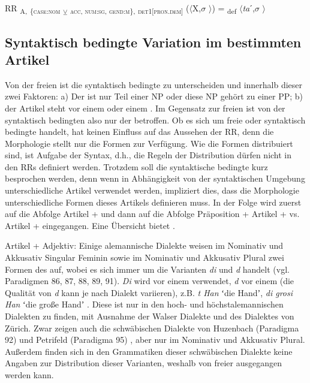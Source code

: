 \ea%
\label{ex:key:139}
 RR \textsubscript{A,} \textsubscript{\{\textsc{case:nom}} \textsubscript{\tiny $\veebar$}\textsubscript{ \textsc{acc}}\textsubscript{, \textsc{num:sg}, \textsc{gend:m}\},} \textsubscript{\textsc{det1[pron.dem]}} ($\langle$X,$\sigma$ $\rangle$) = \textsubscript{def} $\langle$\textit{ta}ˊ,$\sigma$ $\rangle$
\z

\subsection{Syntaktisch bedingte Variation im bestimmten Artikel}\label{5.5.5}

Von der freien  ist die syntaktisch bedingte  zu unterscheiden und innerhalb dieser zwei Faktoren: a) Der  ist nur Teil einer NP oder diese NP gehört zu einer PP; b) der Artikel steht vor einem  oder einem . Im Gegensatz zur freien  ist von der syntaktisch bedingten  also nur der  betroffen. Ob es sich um freie oder syntaktisch bedingte  handelt, hat keinen Einfluss auf das Aussehen der RR, denn die Morphologie stellt nur die Formen zur Verfügung. Wie die Formen distribuiert sind, ist Aufgabe der Syntax, d.h., die Regeln der Distribution dürfen nicht in den RRs definiert werden. Trotzdem soll die syntaktische bedingte  kurz besprochen werden, denn wenn in Abhängigkeit von der syntaktischen Umgebung unterschiedliche Artikel verwendet werden, impliziert dies, dass die Morphologie unterschiedliche Formen dieses Artikels definieren muss. In der Folge wird zuerst auf die Abfolge Artikel +  und dann auf die Abfolge Präposition + Artikel +  vs. Artikel +  eingegangen. Eine Übersicht bietet .

{Artikel + Adjektiv}: Einige alemannische Dialekte weisen im Nominativ und Akkusativ Singular Feminin sowie im Nominativ und Akkusativ Plural zwei Formen des  auf, wobei es sich immer um die Varianten \textit{di} und \textit{d} handelt (vgl. Paradigmen 86, 87, 88, 89, 91). \textit{Di} wird vor einem  verwendet, \textit{d} vor einem  (die Qualität von \textit{d} kann je nach Dialekt variieren), z.B. \textit{t Han} ʻdie Handʼ, \textit{di grosi Han} ʻdie große Handʼ \citep[187, 191, 200]{Henzen1927}. Diese  ist nur in den hoch- und höchstalemannischen Dialekten zu finden, mit Ausnahme der Walser Dialekte und des Dialektes von Zürich. Zwar zeigen auch die schwäbischen Dialekte von Huzenbach (Paradigma 92) und Petrifeld (Paradigma 95) , aber nur im Nominativ und Akkusativ Plural. Außerdem finden sich in den Grammatiken dieser schwäbischen Dialekte keine Angaben zur Distribution dieser Varianten, weshalb von freier  ausgegangen werden kann.


